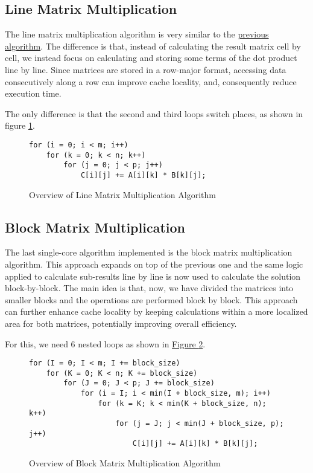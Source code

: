 \subsection{Line Matrix Multiplication}

The line matrix multiplication algorithm is very similar to the \hyperref[section:algorithms:naive]{previous algorithm}. The difference is that, instead of calculating the result matrix cell by cell, we instead focus on calculating and storing some terms of the dot product line by line. Since matrices are stored in a row-major format, accessing data consecutively along a row can improve cache locality, and, consequently reduce execution time.

The only difference is that the second and third loops switch places, as shown in figure \ref{fig:algo:line}.

\begin{figure}[ht!]
\begin{verbatim}
for (i = 0; i < m; i++)
    for (k = 0; k < n; k++)
        for (j = 0; j < p; j++)
            C[i][j] += A[i][k] * B[k][j];
\end{verbatim}
\caption{Overview of Line Matrix Multiplication Algorithm}
\label{fig:algo:line}
\end{figure}

\subsection{Block Matrix Multiplication}

The last single-core algorithm implemented is the block matrix multiplication algorithm. This approach expands on top of the previous one and the same logic applied to calculate sub-results line by line is now used to calculate the solution block-by-block. The main idea is that, now, we have divided the matrices into smaller blocks and the operations are performed block by block. This approach can further enhance cache locality by keeping calculations within a more localized area for both matrices, potentially improving overall efficiency.

For this, we need 6 nested loops as shown in \hyperref[fig:algo:block]{Figure \ref{fig:algo:block}}.

\clearpage

\begin{figure}[ht!]
\begin{verbatim}
for (I = 0; I < m; I += block_size)
    for (K = 0; K < n; K += block_size)
        for (J = 0; J < p; J += block_size)
            for (i = I; i < min(I + block_size, m); i++)
                for (k = K; k < min(K + block_size, n); k++)
                    for (j = J; j < min(J + block_size, p); j++)
                        C[i][j] += A[i][k] * B[k][j];
\end{verbatim}
\caption{Overview of Block Matrix Multiplication Algorithm}
\label{fig:algo:block}
\end{figure}

